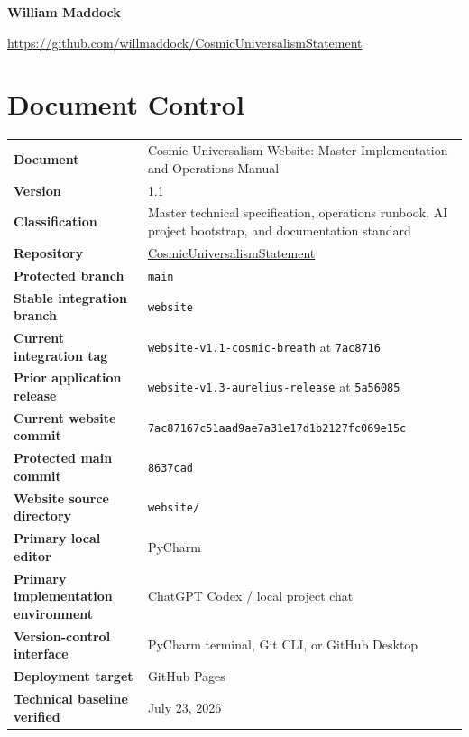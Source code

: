 \documentclass[11pt,letterpaper]{article}
\newcommand{\RepositoryName}{CosmicUniversalismStatement}
\newcommand{\RepositoryURL}{https://github.com/willmaddock/CosmicUniversalismStatement}
\newcommand{\ProtectedBranch}{main}
\newcommand{\StableBranch}{website}
\newcommand{\WebsiteDirectory}{website/}
\newcommand{\CurrentIntegrationTag}{website-v1.1-cosmic-breath}
\newcommand{\CurrentIntegrationCommit}{7ac8716}
\newcommand{\CurrentIntegrationFullCommit}{7ac87167c51aad9ae7a31e17d1b2127fc069e15c}
\newcommand{\PriorReleaseTag}{website-v1.3-aurelius-release}
\newcommand{\PriorReleaseCommit}{5a56085}
\newcommand{\MainCommit}{8637cad}
\newcommand{\DocumentVersion}{1.1}
\newcommand{\VerificationDate}{July 23, 2026}
\newcommand{\AuthorName}{William Maddock}
\newcommand{\filepath}[1]{\nolinkurl{#1}}
\newcommand{\branchname}[1]{\texttt{#1}}
\newcommand{\release}[1]{\texttt{#1}}
\begin{document}
\begin{titlepage}
\vspace{0.32in}

{\large\bfseries \AuthorName}

\vspace{0.08in}

{\small\url{\RepositoryURL}}

\end{titlepage}
\hypersetup{pageanchor=true}
\nopagecolor
\color{CUText}

\section*{Document Control}

\begin{tabularx}{\textwidth}{>{\bfseries}L{1.95in}Y}
Document & Cosmic Universalism Website: Master Implementation and Operations Manual \\
Version & \DocumentVersion \\
Classification & Master technical specification, operations runbook, AI project bootstrap, and documentation standard \\
Repository & \href{\RepositoryURL}{\RepositoryName} \\
Protected branch & \branchname{\ProtectedBranch} \\
Stable integration branch & \branchname{\StableBranch} \\
Current integration tag & \release{\CurrentIntegrationTag} at \release{\CurrentIntegrationCommit} \\
Prior application release & \release{\PriorReleaseTag} at \release{\PriorReleaseCommit} \\
Current website commit & \release{\CurrentIntegrationFullCommit} \\
Protected main commit & \release{\MainCommit} \\
Website source directory & \filepath{\WebsiteDirectory} \\
Primary local editor & PyCharm \\
Primary implementation environment & ChatGPT Codex / local project chat \\
Version-control interface & PyCharm terminal, Git CLI, or GitHub Desktop \\
Deployment target & GitHub Pages \\
Technical baseline verified & \VerificationDate \\
\end{tabularx}
\end{document}
